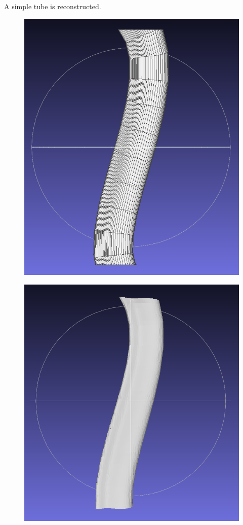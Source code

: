 \documentclass[11p, titlepage]{article}
\newcommand{\reconstructionleft}{0.3}
\newcommand{\reconstructionright}{0.67}
\begin{document}
A simple tube is reconstructed.

\begin{figure}[h!]
     \centering
     \begin{minipage}[b]{\reconstructionleft\linewidth}
       {\includegraphics[width=\linewidth]{originals/simple}}%
     \end{minipage}%
     \hfill
     \begin{minipage}[b]{\reconstructionright\linewidth}
       {\includegraphics[width=.48\linewidth]{reconstructions/dtw-simple-50}}%

\end{minipage}
\end{figure}
\end{document}
